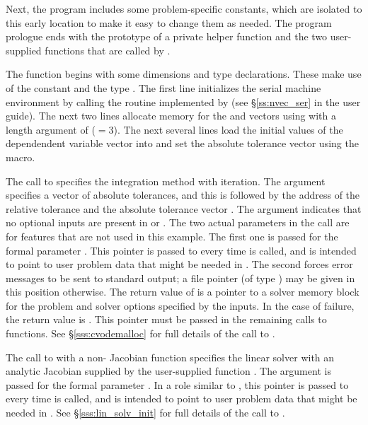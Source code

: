 Next, the program includes some problem-specific constants, which are
isolated to this early location to make it easy to change them as
needed.
The program prologue ends with the prototype of a private helper
function and the two user-supplied functions that are called by
{\cvode}.

The  function begins with some dimensions and type
declarations.  These make use of the constant  and the
type .  The first line initializes the serial machine environment
by calling the  routine implemented by {\nvecs}
(see \S\ref{ss:nvec_ser} in the user guide). The next two lines allocate memory for the
 and  vectors using  with a length
argument of  ($= 3$). The next several lines load the initial
values of the dependendent variable vector into  and set the
absolute tolerance vector  using the  macro.

The call to  specifies the  integration
method with  iteration.  The  argument specifies
a vector of absolute tolerances, and this is followed by the
address of the relative tolerance  and the absolute
tolerance vector .
The  argument indicates that no optional inputs are present
in  or .
The two  actual parameters in the  call 
are for features that are not used in this example. 
The first one is passed for the  formal parameter 
.  This pointer is passed to  every time 
is called, and is intended to point to user problem data that might be
needed in .  The second  forces {\cvode} error messages to
be sent to standard output; a file pointer (of type ) may be
given in this position otherwise.  
The return value of  is a pointer to a
{\cvode} solver memory block for the problem and solver options specified
by the inputs.  In the case of failure, the return value is .
This pointer must be passed in the remaining calls to {\cvode} functions. 
See \S\ref{sss:cvodemalloc} for full details of the call to .

The call to  with a non- Jacobian function 
 specifies the {\cvdense} linear solver with an analytic
Jacobian supplied by the user-supplied function . 
The  argument is passed for the  
formal parameter .  In a role similar to ,
this pointer is passed to  every time  is called, 
and is intended to point to user problem data that might be needed 
in .  See \S\ref{sss:lin_solv_init} for full details of the call
to .


